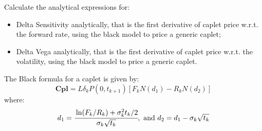 \documentclass[12pt,a4paper]{exam}
\begin{document}
\begin{questions}
%
%
%
%
%
%
\question Calculate the analytical expressions for:
\begin{itemize}
\item Delta Sensitivity analytically, that is the first derivative of caplet price w.r.t. the forward rate, using the black model to price a generic caplet;
\item Delta Vega analytically, that is the first derivative of caplet price w.r.t. the volatility, using the black model to price a generic caplet.
\end{itemize}
\begin{solution}
The Black formula for a caplet is given by:
\begin{equation*}
\textbf{Cpl} = L\delta_k P(0,t_{k+1})[F_k N(d_1)-R_k N(d_2)]
\end{equation*}
where:
\begin{equation*}
d_1 =\cfrac{\ln(F_k/R_k)+\sigma^2_k t_k/2}{\sigma_k \sqrt{t_k}},\text{ and } d_2 = d_1-\sigma_k \sqrt{t_k}
\end{equation*}


\end{solution}
\end{questions}
\end{document}
